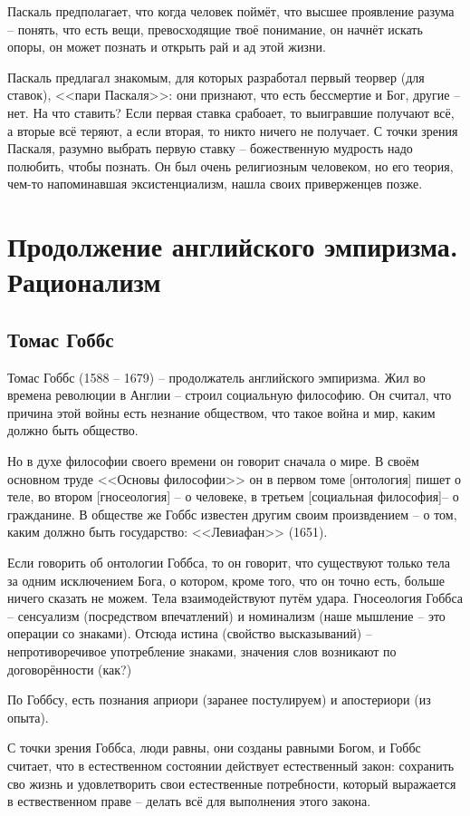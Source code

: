 \documentclass[a4paper, 12pt]{book} %
\begin{document}
Паскаль предполагает, что когда человек поймёт, что высшее проявление разума -- понять, что есть вещи, превосходящие твоё понимание, он начнёт искать опоры, он может познать и открыть рай и ад этой жизни.

Паскаль предлагал знакомым, для которых разработал первый теорвер (для ставок), <<пари Паскаля>>: они признают, что есть бессмертие и Бог, другие -- нет. На что ставить? Если первая ставка срабоает, то выигравшие получают всё, а вторые всё теряют, а если вторая, то никто ничего не получает. С точки зрения Паскаля, разумно выбрать первую ставку -- божественную мудрость надо полюбить, чтобы познать. Он был очень религиозным человеком, но его теория, чем-то напоминавшая эксистенциализм, нашла своих приверженцев позже.

\section{Продолжение английского эмпиризма. Рационализм}
\subsection{Томас Гоббс}
Томас Гоббс (1588 -- 1679) -- продолжатель английского эмпиризма. Жил во времена революции в Англии -- строил социальную философию. Он считал, что причина этой войны есть незнание обществом, что такое война и мир, каким должно быть общество.

Но в духе философии своего времени он говорит сначала о мире. В своём основном труде <<Основы философии>> он в первом томе [онтология] пишет о теле, во втором [гносеология] -- о человеке, в третьем [социальная философия]-- о гражданине. В обществе же Гоббс известен другим своим произвдением -- о том, каким должно быть государство: <<Левиафан>> (1651).

Если говорить об онтологии Гоббса, то он говорит, что существуют только тела за одним исключением Бога, о котором, кроме того, что он точно есть, больше ничего сказать не можем. Тела взаимодействуют путём удара. Гносеология Гоббса -- сенсуализм (посредством впечатлений) и номинализм (наше мышление -- это операции со знаками). Отсюда истина (свойство высказываний) -- непротиворечивое употребление знаками, значения слов возникают по договорённости (как?)

По Гоббсу, есть познания априори (заранее постулируем) и апостериори (из опыта).

С точки зрения Гоббса, люди равны, они созданы равными Богом, и Гоббс считает, что в естественном состоянии действует естественный закон: сохранить сво жизнь и удовлетворить свои естественные потребности, который выражается в ествественном праве -- делать всё для выполнения этого закона. 
\end{document}
